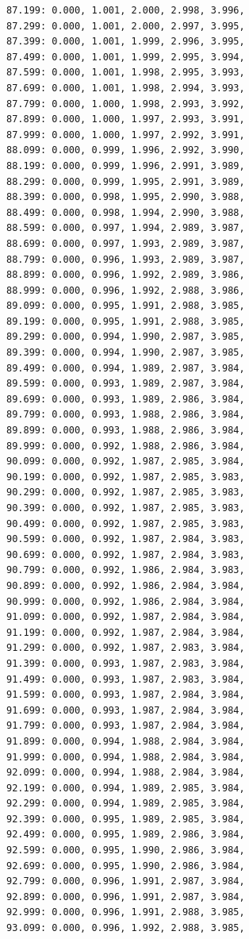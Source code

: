 \documentclass[12pt, a4paper]{article}
\begin{document}
\begin{scriptsize}
\begin{ttfamily}
\begin{lstlisting}
87.199: 0.000, 1.001, 2.000, 2.998, 3.996, 
87.299: 0.000, 1.001, 2.000, 2.997, 3.995, 
87.399: 0.000, 1.001, 1.999, 2.996, 3.995, 
87.499: 0.000, 1.001, 1.999, 2.995, 3.994, 
87.599: 0.000, 1.001, 1.998, 2.995, 3.993, 
87.699: 0.000, 1.001, 1.998, 2.994, 3.993, 
87.799: 0.000, 1.000, 1.998, 2.993, 3.992, 
87.899: 0.000, 1.000, 1.997, 2.993, 3.991, 
87.999: 0.000, 1.000, 1.997, 2.992, 3.991, 
88.099: 0.000, 0.999, 1.996, 2.992, 3.990, 
88.199: 0.000, 0.999, 1.996, 2.991, 3.989, 
88.299: 0.000, 0.999, 1.995, 2.991, 3.989, 
88.399: 0.000, 0.998, 1.995, 2.990, 3.988, 
88.499: 0.000, 0.998, 1.994, 2.990, 3.988, 
88.599: 0.000, 0.997, 1.994, 2.989, 3.987, 
88.699: 0.000, 0.997, 1.993, 2.989, 3.987, 
88.799: 0.000, 0.996, 1.993, 2.989, 3.987, 
88.899: 0.000, 0.996, 1.992, 2.989, 3.986, 
88.999: 0.000, 0.996, 1.992, 2.988, 3.986, 
89.099: 0.000, 0.995, 1.991, 2.988, 3.985, 
89.199: 0.000, 0.995, 1.991, 2.988, 3.985, 
89.299: 0.000, 0.994, 1.990, 2.987, 3.985, 
89.399: 0.000, 0.994, 1.990, 2.987, 3.985, 
89.499: 0.000, 0.994, 1.989, 2.987, 3.984, 
89.599: 0.000, 0.993, 1.989, 2.987, 3.984, 
89.699: 0.000, 0.993, 1.989, 2.986, 3.984, 
89.799: 0.000, 0.993, 1.988, 2.986, 3.984, 
89.899: 0.000, 0.993, 1.988, 2.986, 3.984, 
89.999: 0.000, 0.992, 1.988, 2.986, 3.984, 
90.099: 0.000, 0.992, 1.987, 2.985, 3.984, 
90.199: 0.000, 0.992, 1.987, 2.985, 3.983, 
90.299: 0.000, 0.992, 1.987, 2.985, 3.983, 
90.399: 0.000, 0.992, 1.987, 2.985, 3.983, 
90.499: 0.000, 0.992, 1.987, 2.985, 3.983, 
90.599: 0.000, 0.992, 1.987, 2.984, 3.983, 
90.699: 0.000, 0.992, 1.987, 2.984, 3.983, 
90.799: 0.000, 0.992, 1.986, 2.984, 3.983, 
90.899: 0.000, 0.992, 1.986, 2.984, 3.984, 
90.999: 0.000, 0.992, 1.986, 2.984, 3.984, 
91.099: 0.000, 0.992, 1.987, 2.984, 3.984, 
91.199: 0.000, 0.992, 1.987, 2.984, 3.984, 
91.299: 0.000, 0.992, 1.987, 2.983, 3.984, 
91.399: 0.000, 0.993, 1.987, 2.983, 3.984, 
91.499: 0.000, 0.993, 1.987, 2.983, 3.984, 
91.599: 0.000, 0.993, 1.987, 2.984, 3.984, 
91.699: 0.000, 0.993, 1.987, 2.984, 3.984, 
91.799: 0.000, 0.993, 1.987, 2.984, 3.984, 
91.899: 0.000, 0.994, 1.988, 2.984, 3.984, 
91.999: 0.000, 0.994, 1.988, 2.984, 3.984, 
92.099: 0.000, 0.994, 1.988, 2.984, 3.984, 
92.199: 0.000, 0.994, 1.989, 2.985, 3.984, 
92.299: 0.000, 0.994, 1.989, 2.985, 3.984, 
92.399: 0.000, 0.995, 1.989, 2.985, 3.984, 
92.499: 0.000, 0.995, 1.989, 2.986, 3.984, 
92.599: 0.000, 0.995, 1.990, 2.986, 3.984, 
92.699: 0.000, 0.995, 1.990, 2.986, 3.984, 
92.799: 0.000, 0.996, 1.991, 2.987, 3.984, 
92.899: 0.000, 0.996, 1.991, 2.987, 3.984, 
92.999: 0.000, 0.996, 1.991, 2.988, 3.985, 
93.099: 0.000, 0.996, 1.992, 2.988, 3.985, 

\end{lstlisting}
\end{ttfamily}
\end{scriptsize}
\end{document}
